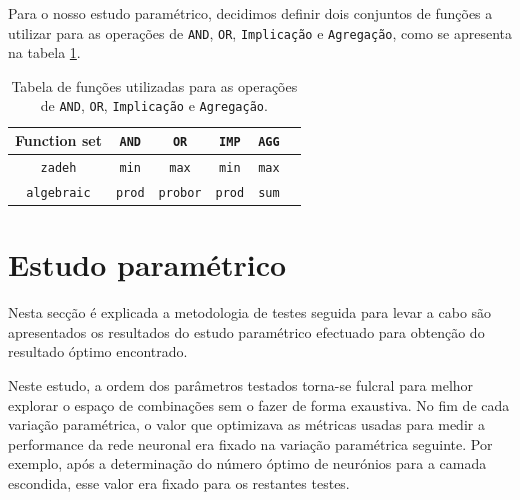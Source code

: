 \documentclass{article}
\begin{document}
Para o nosso estudo paramétrico, decidimos definir dois conjuntos de funções a utilizar para as operações de \texttt{AND}, \texttt{OR}, \texttt{Implicação} e \texttt{Agregação}, como se apresenta na tabela \ref{and_or_imp_agg_table}.

\begin{table}[!h]
\centering
	\caption{Tabela de funções utilizadas para as operações de \texttt{AND}, \texttt{OR}, \texttt{Implicação} e \texttt{Agregação}.}
	\label{and_or_imp_agg_table}
	\begin{tabular}{|c|c|c|c|c|c|}
	\hline
	Function set & \texttt{AND} & \texttt{OR} & \texttt{IMP} & \texttt{AGG} \\
	\hline 
	\texttt{zadeh} & \texttt{min} & \texttt{max} & \texttt{min} & \texttt{max} \\ 
	\hline 
	\texttt{algebraic} & \texttt{prod} & \texttt{probor} & \texttt{prod} & \texttt{sum} \\ 
	\hline 
	\end{tabular} 
\end{table}

\section{Estudo paramétrico}
\indent \indent Nesta secção é explicada a metodologia de testes seguida para levar a cabo são apresentados os resultados do estudo paramétrico efectuado para obtenção do resultado óptimo encontrado.

Neste estudo, a ordem dos parâmetros testados torna-se fulcral para melhor explorar o espaço de combinações sem o fazer de forma exaustiva. No fim de cada variação paramétrica, o valor que optimizava as métricas usadas para medir a performance da rede neuronal era fixado na variação paramétrica seguinte. Por exemplo, após a determinação do número óptimo de neurónios para a camada escondida, esse valor era fixado para os restantes testes.
\end{document}

